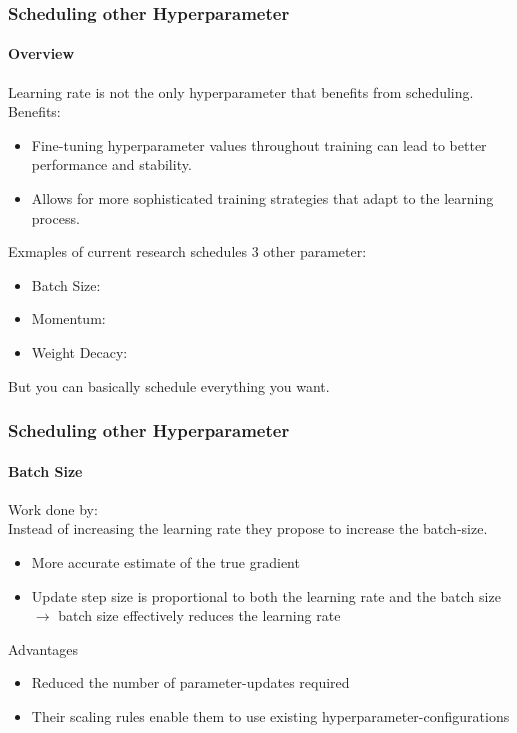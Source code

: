 \documentclass[10pt,aspectratio=169]{beamer}
\begin{document}
    \begin{frame}
        \frametitle{Scheduling other Hyperparameter}
        \framesubtitle{Overview}
        Learning rate is not the only hyperparameter that benefits from scheduling.
        Benefits:
        \begin{itemize}
            \item Fine-tuning hyperparameter values throughout training can lead to better performance and stability.
            \item Allows for more sophisticated training strategies that adapt to the learning process.
        \end{itemize}

        \vspace{0.5cm}
        Exmaples of current research schedules 3 other parameter:
        \begin{itemize}
            \item Batch Size: \cite{smith2017don}
            \item Momentum: \cite{sun2021training}
            \item Weight Decacy: \cite{xie2024overlooked}
        \end{itemize}
        But you can basically schedule everything you want. 
    \end{frame}

    \begin{frame}
        \frametitle{Scheduling other Hyperparameter}
        \framesubtitle{Batch Size}
        Work done by: \cite{smith2017don}\\
        \vspace{0.5cm}
        Instead of increasing the learning rate they propose to increase the batch-size. 
        \begin{itemize}
            \item More accurate estimate of the true gradient
            \item Update step size is proportional to both the learning rate and the batch size $\to$ batch size effectively reduces the learning rate
        \end{itemize}
        \vspace{0.5cm}
        Advantages
        \begin{itemize}
            \item Reduced the number of parameter-updates required
            \item Their scaling rules enable them to use existing hyperparameter-configurations
        \end{itemize}
    \end{frame}
\end{document}
